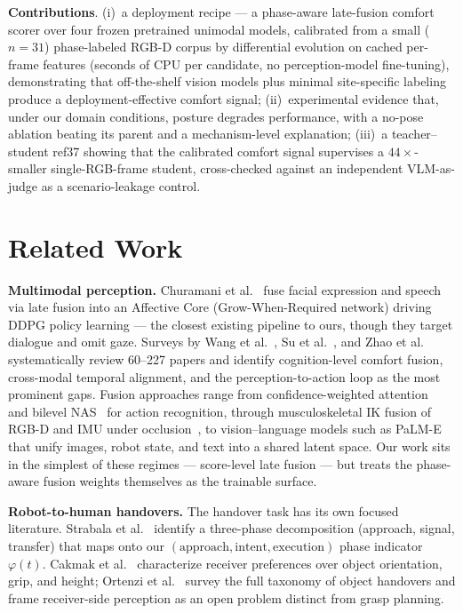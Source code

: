 \documentclass{article}
\begin{document}
\textbf{Contributions}. (i)~a deployment recipe --- a phase-aware late-fusion comfort scorer over four frozen pretrained unimodal models, calibrated from a small ($n=31$) phase-labeled RGB-D corpus by differential evolution on cached per-frame features (seconds of CPU per candidate, no perception-model fine-tuning), demonstrating that off-the-shelf vision models plus minimal site-specific labeling produce a deployment-effective comfort signal; (ii)~experimental evidence that, under our domain conditions, posture degrades performance, with a no-pose ablation beating its parent and a mechanism-level explanation; (iii)~a teacher--student ref37 showing that the calibrated comfort signal supervises a $44\times$-smaller single-RGB-frame student, cross-checked against an independent VLM-as-judge as a scenario-leakage control.

\section{Related Work}

\textbf{Multimodal perception.} Churamani et al.~\cite{ref16} fuse facial expression and speech via late fusion into an Affective Core (Grow-When-Required network) driving DDPG policy learning --- the closest existing pipeline to ours, though they target dialogue and omit gaze. Surveys by Wang et al.~\cite{ref01}, Su et al.~\cite{ref02}, and Zhao et al.~\cite{ref03} systematically review 60--227 papers and identify cognition-level comfort fusion, cross-modal temporal alignment, and the perception-to-action loop as the most prominent gaps. Fusion approaches range from confidence-weighted attention~\cite{ref18} and bilevel NAS~\cite{ref19} for action recognition, through musculoskeletal IK fusion of RGB-D and IMU under occlusion~\cite{ref20}, to vision--language models such as PaLM-E~\cite{ref21} that unify images, robot state, and text into a shared latent space. Our work sits in the simplest of these regimes --- score-level late fusion --- but treats the phase-aware fusion weights themselves as the trainable surface.

\textbf{Robot-to-human handovers.} The handover task has its own focused literature. Strabala et al.~\cite{ref38} identify a three-phase decomposition (approach, signal, transfer) that maps onto our $(\text{approach}, \text{intent}, \text{execution})$ phase indicator $\varphi(t)$. Cakmak et al.~\cite{ref39} characterize receiver preferences over object orientation, grip, and height; Ortenzi et al.~\cite{ref40} survey the full taxonomy of object handovers and frame receiver-side perception as an open problem distinct from grasp planning.
\end{document}

